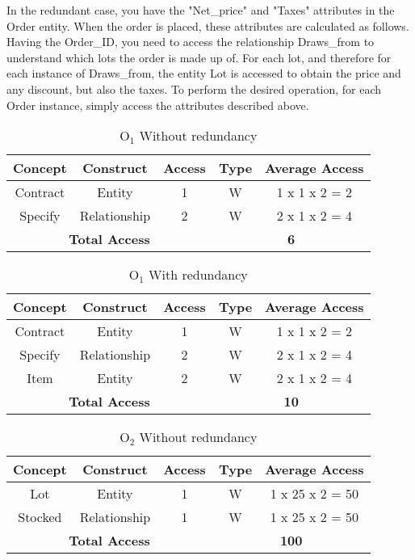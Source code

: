 In the redundant case, you have the "Net\_price" and "Taxes" attributes in the Order entity. When the order is placed, these attributes are calculated as follows. Having the Order\_ID, you need to access the relationship Draws\_from to understand which lots the order is made up of. For each lot, and therefore for each instance of Draws\_from, the entity Lot is accessed to obtain the price and any discount, but also the taxes. To perform the desired operation, for each Order instance, simply access the attributes described above.
\begin{table}[!h]\caption{	$ \textrm{O}_\textrm{1} $ Without redundancy}
	\begin{center}
		\begin{tabular}{| c | c | c | c | c |}
			\hline
			\textbf{Concept} & \textbf{Construct} & \textbf{Access} & \textbf{Type} & \textbf{Average Access} \\ \hline
			Contract & Entity & 1 & W & 1 x 1 x 2 = 2 \\ \hline
			Specify & Relationship & 2 & W & 2 x 1 x 2 = 4 \\ \hline
			\multicolumn{3}{|c|}{\textbf{Total Access}} & \multicolumn{2}{|c|}{\textbf{6}} \\ \hline
		\end{tabular}
	\end{center}
\end{table}
\begin{table}[!h]\caption{	$ \textrm{O}_\textrm{1} $ With redundancy}
	\begin{center}
		\begin{tabular}{| c | c | c | c | c |}
			\hline
			\textbf{Concept} & \textbf{Construct} & \textbf{Access} & \textbf{Type} & \textbf{Average Access} \\ \hline
			Contract & Entity & 1 & W & 1 x 1 x 2 = 2 \\ \hline
			Specify & Relationship & 2 & W & 2 x 1 x 2 = 4 \\ \hline
			Item & Entity & 2 & W & 2 x 1 x 2 = 4 \\ \hline
			\multicolumn{3}{|c|}{\textbf{Total Access}} & \multicolumn{2}{|c|}{\textbf{10}} \\ \hline
		\end{tabular}
	\end{center}
\end{table}
\begin{table}[!h]\caption{	$ \textrm{O}_\textrm{2} $ Without redundancy}
	\begin{center}
		\begin{tabular}{| c | c | c | c | c |}
			\hline
			\textbf{Concept} & \textbf{Construct} & \textbf{Access} & \textbf{Type} & \textbf{Average Access} \\ \hline
			Lot & Entity & 1 & W & 1 x 25 x 2 = 50 \\ \hline
			Stocked & Relationship & 1 & W & 1 x 25 x 2 = 50 \\ \hline
			\multicolumn{3}{|c|}{\textbf{Total Access}} & \multicolumn{2}{|c|}{\textbf{100}} \\ \hline
		\end{tabular}
	\end{center}
\end{table}
